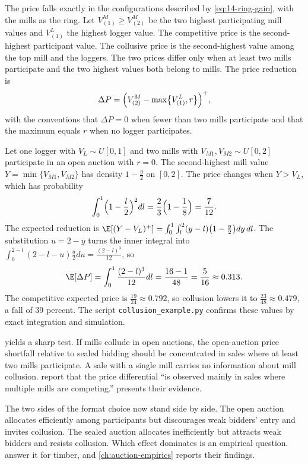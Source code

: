 The price falls exactly in the configurations described by \eqref{eq:14-ring-gain}, with the mills
as the ring. Let $V^M_{(1)}\ge V^M_{(2)}$ be the two highest participating mill values and
$V^L_{(1)}$ the highest logger value. The competitive price is the second-highest participant value.
The collusive price is the second-highest value among the top mill and the loggers. The two prices
differ only when at least two mills participate and the two highest values both belong to mills. The
price reduction is
\begin{equation}\label{eq:14-als-price-drop}
\Delta P=\Bigl(V^M_{(2)}-\max\bigl\{V^L_{(1)},r\bigr\}\Bigr)^+ ,
\end{equation}
with the conventions that $\Delta P=0$ when fewer than two mills participate and that the maximum
equals $r$ when no logger participates.

\begin{example}\label{ex:14-collusion}
Let one logger with $V_L\sim U[0,1]$ and two mills with $V_{M1},V_{M2}\sim U[0,2]$ participate in an
open auction with $r=0$. The second-highest mill value $Y=\min\{V_{M1},V_{M2}\}$ has density
$1-\frac{y}{2}$ on $[0,2]$. The price changes when $Y>V_L$, which has probability
\[
\int_0^1\Bigl(1-\frac{l}{2}\Bigr)^2dl=\frac{2}{3}\Bigl(1-\frac{1}{8}\Bigr)=\frac{7}{12}.
\]
The expected reduction is $\E[(Y-V_L)^+]=\int_0^1\int_l^2(y-l)\bigl(1-\frac{y}{2}\bigr)dy\,dl$. The
substitution $u=2-y$ turns the inner integral into $\int_0^{2-l}(2-l-u)\frac{u}{2}du=\frac{(2-l)^3}{12}$,
so
\[
\E[\Delta P]=\int_0^1\frac{(2-l)^3}{12}dl=\frac{16-1}{48}=\frac{5}{16}\approx 0.313 .
\]
The competitive expected price is $\frac{19}{24}\approx 0.792$, so collusion lowers it to
$\frac{23}{48}\approx 0.479$, a fall of 39 percent. The script \texttt{collusion\_example.py} confirms
these values by exact integration and simulation.
\end{example}

 yields a sharp test. If mills collude in open auctions,
the open-auction price shortfall relative to sealed bidding should be concentrated in sales where at
least two mills participate. A sale with a single mill carries no information about mill collusion.
\citet[Section I]{AtheyLevinSeira2011} report that the price differential ``is observed mainly in
sales where multiple mills are competing.''  presents their evidence.

The two sides of the format choice now stand side by side. The open auction allocates efficiently
among participants but discourages weak bidders' entry and invites collusion. The sealed auction
allocates inefficiently but attracts weak bidders and resists collusion. Which effect dominates is
an empirical question. \citet{AtheyLevinSeira2011} answer it for timber, and
\cref{ch:auction-empirics} reports their findings.

